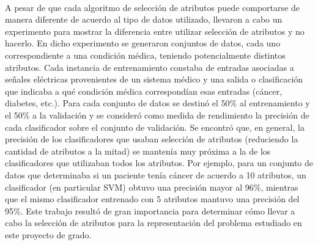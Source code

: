 \paragraph{}A pesar de que cada algoritmo de selección de atributos puede comportarse de manera diferente de acuerdo al tipo de datos utilizado, \citet{fs-survey} llevaron a cabo un experimento para mostrar la diferencia entre utilizar selección de atributos y no hacerlo.
En dicho experimento se generaron conjuntos de datos, cada uno correspondiente a una condición médica, teniendo potencialmente distintos atributos.
Cada instancia de entrenamiento constaba de entradas asociadas a señales eléctricas provenientes de un sistema médico y una salida o clasificación que indicaba a qué condición médica correspondían esas entradas (cáncer, diabetes, etc.).
Para cada conjunto de datos se destinó el 50\% al entrenamiento y el 50\% a la validación y se consideró como medida de rendimiento la precisión de cada clasificador sobre el conjunto de validación.
Se encontró que, en general, la precisión de los clasificadores que usaban selección de atributos (reduciendo la cantidad de atributos a la mitad) se mantenía muy próxima a la de los clasificadores que utilizaban todos los atributos.
Por ejemplo, para un conjunto de datos que determinaba si un paciente tenía cáncer de acuerdo a 10 atributos, un clasificador (en particular SVM) obtuvo una precisión mayor al 96\%, mientras que el mismo clasificador entrenado con 5 atributos mantuvo una precisión del 95\%.
Este trabajo resultó de gran importancia para determinar cómo llevar a cabo la selección de atributos para la representación del problema estudiado en este proyecto de grado.

